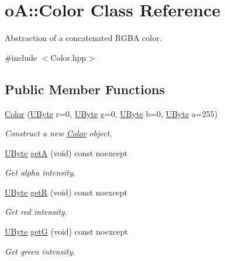 \hypertarget{classo_a_1_1_color}{}\section{oA\+:\+:Color Class Reference}
\label{classo_a_1_1_color}


Abstraction of a concatenated R\+G\+BA color.  




{\ttfamily \#include $<$Color.\+hpp$>$}

\subsection*{Public Member Functions}
\begin{DoxyCompactItemize}
\item 
\mbox{\hyperlink{classo_a_1_1_color_a62152f87069a3a2905086814012a3fea}{Color}} (\mbox{\hyperlink{namespaceo_a_a8c38e43a304d568b8495770dd8d50513}{U\+Byte}} r=0, \mbox{\hyperlink{namespaceo_a_a8c38e43a304d568b8495770dd8d50513}{U\+Byte}} g=0, \mbox{\hyperlink{namespaceo_a_a8c38e43a304d568b8495770dd8d50513}{U\+Byte}} b=0, \mbox{\hyperlink{namespaceo_a_a8c38e43a304d568b8495770dd8d50513}{U\+Byte}} a=255)
\begin{DoxyCompactList}\small\item\em Construct a new \mbox{\hyperlink{classo_a_1_1_color}{Color}} object. \end{DoxyCompactList}\item 
\mbox{\hyperlink{namespaceo_a_a8c38e43a304d568b8495770dd8d50513}{U\+Byte}} \mbox{\hyperlink{classo_a_1_1_color_a27cd67a64f4cc15f09fb7686890add8f}{getA}} (void) const noexcept
\begin{DoxyCompactList}\small\item\em Get alpha intensity. \end{DoxyCompactList}\item 
\mbox{\hyperlink{namespaceo_a_a8c38e43a304d568b8495770dd8d50513}{U\+Byte}} \mbox{\hyperlink{classo_a_1_1_color_af53e0f3c94638ab041fe05ce7356c2d8}{getR}} (void) const noexcept
\begin{DoxyCompactList}\small\item\em Get red intensity. \end{DoxyCompactList}\item 
\mbox{\hyperlink{namespaceo_a_a8c38e43a304d568b8495770dd8d50513}{U\+Byte}} \mbox{\hyperlink{classo_a_1_1_color_a3dcd5785db4a2c1a5a49a70d5378154a}{getG}} (void) const noexcept
\begin{DoxyCompactList}\small\item\em Get green intensity. \end{DoxyCompactList}\item 

\end{DoxyCompactItemize}
